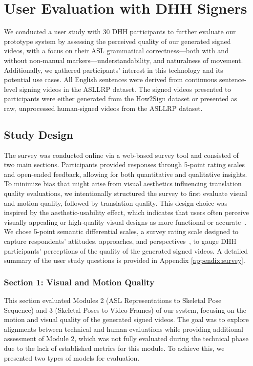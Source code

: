 \section{User Evaluation with DHH Signers}\label{sec:user_study}

We conducted a user study with 30 DHH participants to further evaluate our prototype system by assessing the perceived quality of our generated signed videos, with a focus on their ASL grammatical correctness---both with and without non-manual markers---understandability, and naturalness of movement. Additionally, we gathered participants' interest in this technology and its potential use cases. All English sentences were derived from continuous sentence-level signing videos in the ASLLRP dataset. The signed videos presented to participants were either generated from the How2Sign dataset or presented as raw, unprocessed human-signed videos from the ASLLRP dataset.

\subsection{Study Design}\label{subsec:study_design}
The survey was conducted online via a web-based survey tool and consisted of two main sections. Participants provided responses through 5-point rating scales and open-ended feedback, allowing for both quantitative and qualitative insights. To minimize bias that might arise from visual aesthetics influencing translation quality evaluations, we intentionally structured the survey to first evaluate visual and motion quality, followed by translation quality. This design choice was inspired by the aesthetic-usability effect, which indicates that users often perceive visually appealing or high-quality visual designs as more functional or accurate~\cite{tractinsky2000beautiful,hoegg2010good}. We chose 5-point semantic differential scales, a survey rating scale designed to capture respondents' attitudes, approaches, and perspectives~\cite{osgood1964semantic,osgood1957measurement,semantic_diff}, to gauge DHH participants' perceptions of the quality of the generated signed videos. A detailed summary of the user study questions is provided in Appendix \ref{appendix:survey}.

\subsubsection{Section 1: Visual and Motion Quality}\label{subsubsec:sec1} This section evaluated Modules 2 (ASL Representations to Skeletal Pose Sequence) and 3 (Skeletal Poses to Video Frames) of our system, focusing on the motion and visual quality of the generated signed videos. The goal was to explore alignments between technical and human evaluations while providing additional assessment of Module 2, which was not fully evaluated during the technical phase due to the lack of established metrics for this module. To achieve this, we presented two types of models for evaluation. 


